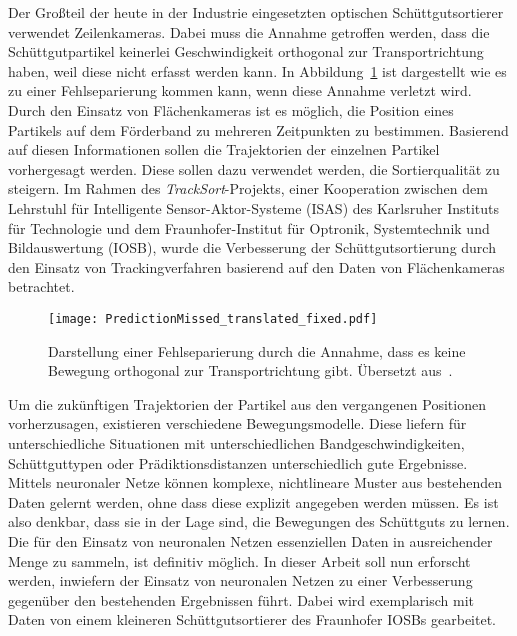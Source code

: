 
Der Großteil der heute in der Industrie eingesetzten optischen Schüttgutsortierer verwendet Zeilenkameras.
Dabei muss die Annahme getroffen werden, dass die Schüttgutpartikel keinerlei Geschwindigkeit orthogonal zur Transportrichtung haben,
weil diese nicht erfasst werden kann.
In Abbildung~\ref{fig:predMissed} ist dargestellt wie es zu einer Fehlseparierung kommen kann, wenn diese Annahme verletzt wird. \\
Durch den Einsatz von Flächenkameras ist es möglich, die Position eines Partikels auf dem Förderband zu mehreren Zeitpunkten zu bestimmen.
Basierend auf diesen Informationen sollen die Trajektorien der einzelnen Partikel vorhergesagt werden.
Diese sollen dazu verwendet werden, die Sortierqualität zu steigern. 
Im Rahmen des \textit{TrackSort}-Projekts, 
einer Kooperation zwischen dem Lehrstuhl für Intelligente Sensor-Aktor-Systeme (ISAS) des Karlsruher Instituts für Technologie
und dem Fraunhofer-Institut für Optronik, Systemtechnik und Bildauswertung (IOSB), 
wurde die Verbesserung der Schüttgutsortierung durch den Einsatz von Trackingverfahren basierend auf den Daten von Flächenkameras betrachtet.

\begin{figure}[h]
    \centering
    \texttt{[image: PredictionMissed\_translated\_fixed.pdf]}
    \caption[Fehlseparierung bei konventionellen optischen Schüttgutsortierern. Übersetzt aus~~\cite{Pfaff2018}]
    {Darstellung einer Fehlseparierung durch die Annahme, dass es keine Bewegung orthogonal zur Transportrichtung gibt. 
    Übersetzt aus~\cite{Pfaff2018}.}
    \label{fig:predMissed}
\end{figure}


Um die zukünftigen Trajektorien der Partikel aus den vergangenen Positionen vorherzusagen, existieren verschiedene Bewegungsmodelle.
Diese liefern für unterschiedliche Situationen mit unterschiedlichen Bandgeschwindigkeiten, Schüttguttypen oder Prädiktionsdistanzen unterschiedlich gute Ergebnisse.  
Mittels neuronaler Netze können komplexe, nichtlineare Muster aus bestehenden Daten gelernt werden, ohne dass diese explizit angegeben werden müssen.
Es ist also denkbar, dass sie in der Lage sind, die Bewegungen des Schüttguts zu lernen.
Die für den Einsatz von neuronalen Netzen essenziellen Daten in ausreichender Menge zu sammeln, ist definitiv möglich. 
In dieser Arbeit soll nun erforscht werden, inwiefern der Einsatz von neuronalen Netzen zu einer Verbesserung gegenüber den bestehenden Ergebnissen führt.
Dabei wird exemplarisch mit Daten von einem kleineren Schüttgutsortierer des Fraunhofer IOSBs gearbeitet.

